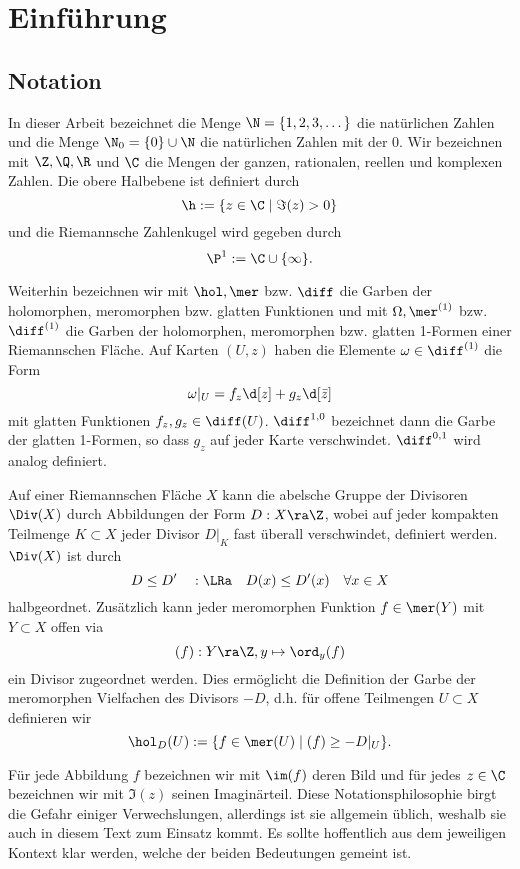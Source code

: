 
\section{Einführung}
\label{sec:einführung}

\subsection{Notation}
\label{sec:notation}

In dieser Arbeit bezeichnet die Menge $\N = \{1, 2, 3, \dots\}$ die natürlichen
Zahlen und die Menge $\N_0 = \{0 \} \cup \N$ die natürlichen Zahlen mit der
0. Wir bezeichnen mit $\Z, \Q, \R$ und $\C$ die Mengen der ganzen,
rationalen, reellen und komplexen Zahlen. Die 
obere Halbebene ist definiert durch
\[
\h := \{ z \in \C \mid \Im(z) > 0 \}
\]
und die Riemannsche Zahlenkugel wird gegeben durch
\[
\P^1 := \C \cup \{\infty\}.
\]

Weiterhin bezeichnen wir mit $\hol, \mer$ bzw. $\diff$
die Garben der holomorphen, meromorphen bzw. glatten Funktionen und mit
$\Omega, \mer^{(1)}$ bzw. $\diff^{(1)}$ die Garben der holomorphen,
meromorphen bzw. glatten 1-Formen einer Riemannschen Fläche. Auf Karten $(U,z)$ haben die
Elemente $\omega \in \diff^{(1)}$ die Form
\[
\omega|_U = f_z \d[z] + g_z\d[\bar z]
\]
mit glatten Funktionen $f_z,g_z \in \diff(U)$. $\diff^{1,0}$ bezeichnet
dann die Garbe der glatten 1-Formen, so dass $g_z$ auf jeder Karte
verschwindet. $\diff^{0,1}$ wird analog definiert.

Auf einer Riemannschen Fläche $X$ kann die abelsche Gruppe der
Divisoren $\Div(X)$ durch Abbildungen der Form $D: X \ra \Z$, wobei
auf jeder kompakten Teilmenge $K \subset X$ jeder Divisor $D|_K$ fast
überall verschwindet, definiert werden. $\Div(X)$ ist durch
\[
D \leq D' \quad :\LRa \quad D(x) \leq D'(x) \quad \forall x \in X
\]
halbgeordnet. Zusätzlich kann jeder meromorphen Funktion $f \in \mer(Y)$ mit $Y
\subset X$ offen via
\[
(f): Y \ra \Z, y \mapsto \ord_y(f)
\]
ein Divisor zugeordnet werden. Dies ermöglicht die Definition der
Garbe der meromorphen Vielfachen des Divisors $-D$, d.h. für offene
Teilmengen $U \subset X$ definieren wir
\[
\hol_D(U) := \{f \in \mer(U) \mid (f) \geq -D|_U \}.
\]

Für jede Abbildung $f$ bezeichnen wir mit $\im(f)$ deren Bild und für
jedes $z \in \C$ bezeichnen wir mit $\Im(z)$ seinen Imaginärteil. Diese
Notationsphilosophie birgt die Gefahr einiger Verwechslungen,
allerdings ist sie allgemein üblich, weshalb sie auch in diesem Text
zum Einsatz kommt. Es sollte hoffentlich aus dem jeweiligen Kontext
klar werden, welche der beiden Bedeutungen gemeint ist.

